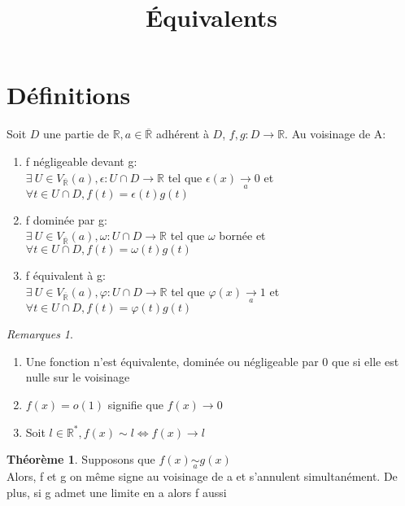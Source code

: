 \documentclass[fleqn]{article}
\title{\'Equivalents}
\date{}
\theoremstyle{definition} \newtheorem*{defi}{D\'efinition}
\theoremstyle{definition} \newtheorem*{theo}{Th\'eor\`eme}
\theoremstyle{remark} \newtheorem*{rqs}{Remarques}
\begin{document}
\maketitle

\section{D\'efinitions}
Soit $D$ une partie de $\mathbb{R}, a \in \overline{\mathbb{R}}$ adh\'erent \`a $D$, $f,g: D \rightarrow \mathbb{R}$. Au voisinage de A:
\begin{enumerate}
	\item f n\'egligeable devant g: \\
		$\exists\ U \in V_{\overline{\mathbb{R}}%
		}(a), \epsilon: U \cap D \rightarrow \mathbb{R}$ tel que
		$\epsilon(x)\underset{a}{\rightarrow}  0$ et $\forall t \in U \cap D, f(t)=\epsilon(t)g(t)$
	\item f domin\'ee par g: \\
		$\exists\ U \in V_{\overline{\mathbb{R}}%
		}(a), \omega: U \cap D \rightarrow \mathbb{R}$ tel que $\omega$ born\'ee et
		$\forall t \in U \cap D, f(t)=\omega(t)g(t)$
	\item f \'equivalent \`a g: \\
		$\exists\ U \in V_{\overline{\mathbb{R}}%
		}(a), \varphi: U \cap D \rightarrow \mathbb{R}$ tel que
		$\varphi(x)\underset{a}{\rightarrow} 1$ et $\forall t \in U \cap D, f(t)=\varphi(t)g(t)$
\end{enumerate}

\begin{rqs} $ $
	\begin{enumerate}
		\item Une fonction n'est \'equivalente, domin\'ee ou n\'egligeable par 0 que si elle est nulle sur le voisinage
		\item $f(x) = o(1)$ signifie que $f(x) \rightarrow 0$
		\item Soit $l \in \mathbb{R}^{*}, f(x) \sim l \Leftrightarrow f(x) \rightarrow l$
	\end{enumerate}
\end{rqs}

\begin{theo}
	Supposons que $f(x)\underset{a}{\sim} g(x)$\\
	Alors, f et g on m\^eme signe au voisinage de a et s'annulent simultan\'ement. De plus, si g admet une limite en a alors f aussi
\end{theo}
\end{document}
